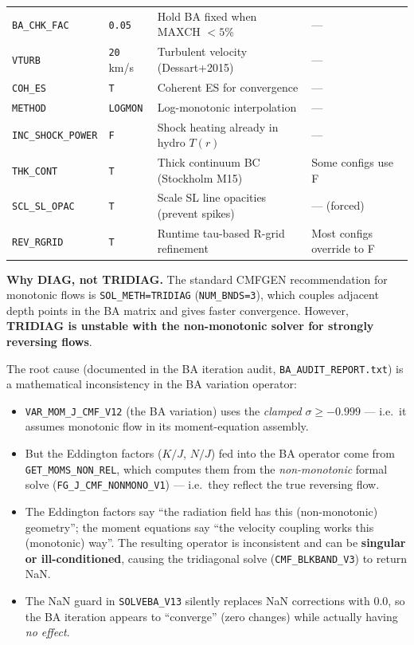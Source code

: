 \documentclass[11pt]{article}
\begin{document}
\begin{center}
\begin{tabular}{llll}
\texttt{BA\_CHK\_FAC}  & \texttt{0.05} & Hold BA fixed when MAXCH $< 5\%$ & --- \\
\texttt{VTURB}         & \texttt{20} km/s & Turbulent velocity (Dessart+2015) & --- \\
\texttt{COH\_ES}       & \texttt{T}  & Coherent ES for convergence & --- \\
\texttt{METHOD}        & \texttt{LOGMON} & Log-monotonic interpolation & --- \\
\texttt{INC\_SHOCK\_POWER} & \texttt{F} & Shock heating already in hydro $T(r)$ & --- \\
\texttt{THK\_CONT}     & \texttt{T}  & Thick continuum BC (Stockholm M15) & Some configs use F \\
\texttt{SCL\_SL\_OPAC} & \texttt{T}  & Scale SL line opacities (prevent spikes) & --- (forced) \\
\texttt{REV\_RGRID}    & \texttt{T}  & Runtime tau-based R-grid refinement & Most configs override to F \\
\bottomrule
\end{tabular}
\end{center}

\textbf{Why DIAG, not TRIDIAG.}\quad
The standard CMFGEN recommendation for monotonic flows is
\texttt{SOL\_METH=TRIDIAG} (\texttt{NUM\_BNDS=3}), which couples
adjacent depth points in the BA matrix and gives faster convergence.
However, \textbf{TRIDIAG is unstable with the non-monotonic solver for
strongly reversing flows}.

The root cause (documented in the BA iteration audit,
\texttt{BA\_AUDIT\_REPORT.txt}) is a mathematical inconsistency in the
BA variation operator:
\begin{itemize}[nosep]
  \item \texttt{VAR\_MOM\_J\_CMF\_V12} (the BA variation) uses the
        \emph{clamped} $\sigma \ge -0.999$ --- i.e.\ it assumes
        monotonic flow in its moment-equation assembly.
  \item But the Eddington factors ($K/J$, $N/J$) fed into the BA
        operator come from \texttt{GET\_MOMS\_NON\_REL}, which computes
        them from the \emph{non-monotonic} formal solve
        (\texttt{FG\_J\_CMF\_NONMONO\_V1}) --- i.e.\ they reflect the
        true reversing flow.
  \item The Eddington factors say ``the radiation field has this
        (non-monotonic) geometry''; the moment equations say ``the
        velocity coupling works this (monotonic) way''.  The resulting
        operator is inconsistent and can be \textbf{singular or
        ill-conditioned}, causing the tridiagonal solve
        (\texttt{CMF\_BLKBAND\_V3}) to return NaN.
  \item The NaN guard in \texttt{SOLVEBA\_V13} silently replaces NaN
        corrections with 0.0, so the BA iteration appears to ``converge''
        (zero changes) while actually having \emph{no effect}.
\end{itemize}
\end{document}

